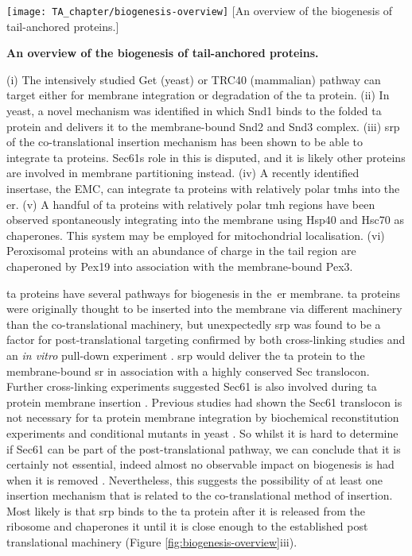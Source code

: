 \begin{sidewaysfigure}
\centering
\texttt{[image: TA\_chapter/biogenesis-overview]}
        [An overview of the biogenesis of tail-anchored proteins.]{\textbf{An overview of the biogenesis of tail-anchored proteins.}

        (i) The intensively studied Get (yeast) or TRC40 (mammalian) pathway can target either for membrane integration or degradation of the \gls{ta} protein.
        (ii) In yeast, a novel mechanism was identified in which Snd1 binds to the folded \gls{ta} protein and delivers it to the membrane\--bound Snd2 and Snd3 complex.
        (iii) \gls{srp} of the co-translational insertion mechanism has been shown to be able to integrate \gls{ta} proteins. Sec61s role in this is disputed, and it is likely other proteins are involved in membrane partitioning instead.
        (iv) A recently identified insertase, the EMC, can integrate \gls{ta} proteins with relatively polar \gls{tmh}s into the \gls{er}.
        (v) A handful of \gls{ta} proteins with relatively polar \gls{tmh} regions have been observed spontaneously integrating into the membrane using Hsp40 and Hsc70 as chaperones.
        This system may be employed for mitochondrial localisation.
        (vi) Peroxisomal proteins with an abundance of charge in the tail region are chaperoned by Pex19 into association with the membrane\--bound Pex3.
}

\label{fig:biogenesis-overview}
\end{sidewaysfigure}

\gls{ta} proteins have several pathways for biogenesis in the~\gls{er} membrane.
\gls{ta} proteins were originally thought to be inserted into the membrane via different machinery than the co-translational machinery, but unexpectedly \gls{srp} was found to be a factor for post\--translational targeting confirmed by both cross-linking studies \cite{Abell2004} and an \textit{in vitro} pull-down experiment \cite{Leznicki2010}.
\gls{srp} would deliver the \gls{ta} protein to the membrane\--bound \gls{sr} in association with a highly conserved Sec translocon.
Further cross-linking experiments suggested Sec61 is also involved during \gls{ta} protein membrane insertion \cite{Abell2003}.
Previous studies had shown the Sec61 translocon is not necessary for \gls{ta} protein membrane integration by biochemical reconstitution experiments \cite{Kutay1993} and conditional mutants in yeast \cite{Steel2002, Yabal2003}.
So whilst it is hard to determine if Sec61 can be part of the post\--translational pathway, we can conclude that it is certainly not essential, indeed almost no observable impact on biogenesis is had when it is removed \cite{Kutay1993, Steel2002, Yabal2003}.
Nevertheless, this suggests the possibility of at least one insertion mechanism that is related to the co-translational method of insertion.
Most likely is that \gls{srp} binds to the \gls{ta} protein after it is released from the ribosome and chaperones it until it is close enough to the established post translational machinery \cite{Casson2017} (Figure \ref{fig:biogenesis-overview}iii).

